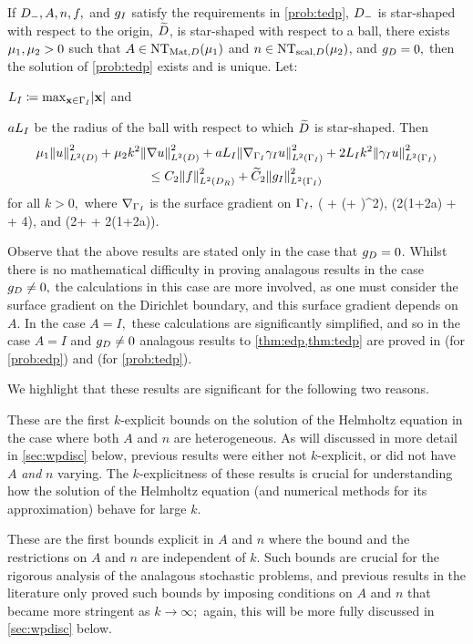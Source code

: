 \label{thm:tedp}
If $D_{-}, A, n, f,$ and $g_{I}$ satisfy the requirements in \cref{prob:tedp}, $D_{-}$ is star-shaped with respect to the origin, $\widetilde{D}$, is star-shaped with respect to a ball, there exists $\mu_{1}, \mu_{2} > 0$ such that $A \in \NTAD{\muo}$ and $n \in \NTnD{\mut}$, and $g_{D} = 0,$ then the solution of \cref{prob:tedp} exists and is unique. Let:
\bit
\item $\LI \de \max_{\bx \in \GI} \abs{\bx}$ and
\item $aL_{I}$ be the radius of the ball with respect to which $\widetilde{D}$ is star-shaped.
    \eit
Then
\begin{multline*}
  \muo \NLtD{u}^2 + \mut k^2 \NLtD{\grad u}^2 + a\LI\NLtGI{\gradGI \trGI u}^2 + 2\LI k^2 \NLtGI{\trGI u}^2\\
  \leq \Ct \NLtDR{f}^2 + \Cttilde \NLtGI{\gI}^2
\end{multline*}
for all $k>0,$ where $\nabla_{\Gamma_{I}}$ is the surface gradient on $\Gamma_{I},$
\beqs
\Ct {}\mleft( + \mleft(\beta + \mright)^2\mright),
\eeqs
\beqs
\Cttilde {}\mleft(2\mleft(1+\frac2a\mright) + \frac\beta{\LI} + 4\mright)\LI,
\eeqs
and
\beqs
\beta \de \LI \mleft(2+ + 2\mleft(1+\frac2a\mright)\mright).
\eeqs
\enth

Observe that the above results are stated only in the case that $g_{D} = 0$. Whilst there is no mathematical difficulty in proving analagous results in the case $g_{D} \neq 0,$ the calculations in this case are more involved, as one must consider the surface gradient on the Dirichlet boundary, and this surface gradient depends on $A.$ In the case $A=I,$ these calculations are significantly simplified, and so in the case $A=I$ and $g_{D} \neq 0$ analagous results to \cref{thm:edp,thm:tedp} are proved in \cite[Theorem 2.19(ii)]{GrPeSp:19} (for \cref{prob:edp}) and \cite[Theorem A.6(iv)]{GrPeSp:19} (for \cref{prob:tedp}).

We highlight that these results are significant for the following two reasons.
\bit
\item These are the first $k$-explicit bounds on the solution of the Helmholtz equation in the case where both $A$ and $n$ are heterogeneous. As will discussed in more detail in \cref{sec:wpdisc} below, previous results were either not $k$-explicit, or did not have $A$ \emph{and} $n$ varying. The $k$-explicitness of these results is crucial for understanding how the solution of the Helmholtz equation (and numerical methods for its approximation) behave for large $k.$
  \item These are the first bounds explicit in $A$ and $n$ where the bound and the restrictions on $A$ and $n$ are independent of $k.$ Such bounds are crucial for the rigorous analysis of the analagous stochastic problems, and previous results in the literature only proved such bounds by imposing conditions on $A$ and $n$ that became more stringent as $k \rightarrow \infty;$ again, this will be more fully discussed in \cref{sec:wpdisc} below.
\eit

